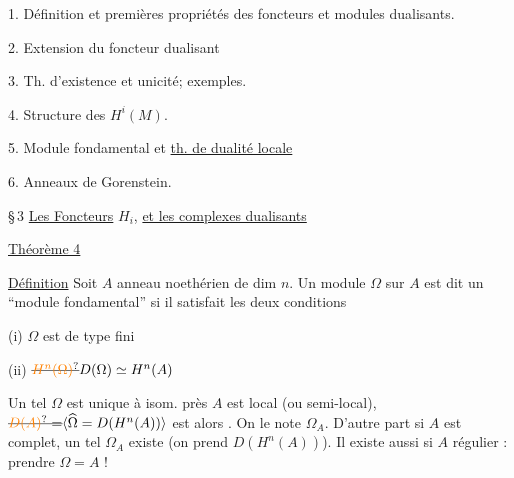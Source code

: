 1. Définition et premières propriétés des foncteurs et modules dualisants.

2. Extension du foncteur dualisant

3. Th. d'existence et unicité; exemples.

4.  Structure des $H^i(M)$.

5. Module fondamental et \uline{th. de dualité locale}

6. Anneaux de Gorenstein.


\S\,3 \uline{Les Foncteurs} $H_i$, \uline{et les complexes dualisants}


\uline{Théorème 4}

\uline{Définition} Soit $A$ anneau  noethérien de dim $n$.
Un module $\Omega$ sur $A$ est dit un \textquotedblleft module fondamental\textquotedblright{}
 si il satisfait les deux conditions


(i) $\Omega$ est de type fini

(ii) $\deleted{\unsure{H^n(\Omega)}} D(\Omega)\simeq H^n(A)$

Un tel $\Omega$ est unique à isom. près  
$A$ est local (ou semi-local),  $\deleted{\unsure{D(A)}=}\inserted{\widehat\Omega=D(H^n(A))}$
est alors . On le note $\Omega_A$. D'autre part si $A$ est  complet, un tel $\Omega_A$ existe
 (on prend $D(H^n(A))$). Il existe aussi
si $A$ régulier  : prendre $\Omega=A$ !



